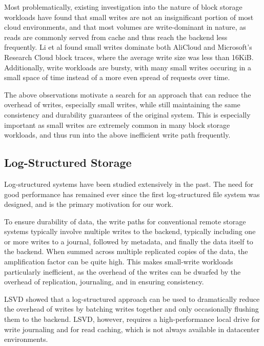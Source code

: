 Most problematically, existing investigation into the nature of block storage
workloads have found that small writes are not an insignificant portion of most
cloud environments, and that most volumes are write-dominant in nature, as reads
are commonly served from cache and thus reach the backend less frequently.  Li
et al \cite{li2020depth} found small writes dominate both AliCloud and
Microsoft's Research Cloud block traces, where the average write size was less
than 16KiB.  Additionally, write workloads are bursty, with many small writes
occuring in a small space of time instead of a more even spread of requests over
time.

The above observations motivate a search for an approach that can reduce the
overhead of writes, especially small writes, while still maintaining the same
consistency and durability guarantees of the original system. This is especially
important as small writes are extremely common in many block storage workloads,
and thus run into the above inefficient write path frequently.


\subsection{Log-Structured Storage}

Log-structured systems have been studied extensively in the past. The need for
good performance has remained ever since the first log-structured file system
was designed, and is the primary motivation for our work.

To ensure durability of data, the write paths for conventional remote storage
systems typically involve multiple writes to the backend, typically including
one or more writes to a journal, followed by metadata, and finally the data
itself to the backend. When summed across multiple replicated copies of the
data, the amplification factor can be quite high. This makes small-write
workloads particularly inefficient, as the overhead of the writes can be
dwarfed by the overhead of replication, journaling, and in ensuring consistency.

LSVD showed that a log-structured approach can be used to dramatically reduce
the overhead of writes by batching writes together and only occasionally
flushing them to the backend. LSVD, however, requires a high-performance local
drive for write journaling and for read caching, which is not always available
in datacenter environments.


